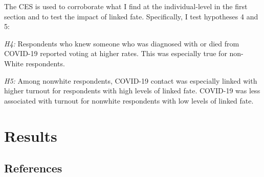 \documentclass[
  12pt,
]{article}
\begin{document}
The CES is used to corroborate what I find at the individual-level in the first section and to test the impact of linked fate. Specifically, I test hypotheses 4 and 5:

\emph{H4:} Respondents who knew someone who was diagnosed with or died from COVID-19 reported voting at higher rates. This was especially true for non-White respondents.

\emph{H5:} Among nonwhite respondents, COVID-19 contact was especially linked with higher turnout for respondents with high levels of linked fate. COVID-19 was less associated with turnout for nonwhite respondents with low levels of linked fate.

\hypertarget{results}{%
\section*{Results}\label{results}}

\newpage

\hypertarget{references}{%
\subsection*{References}\label{references}}
\end{document}

